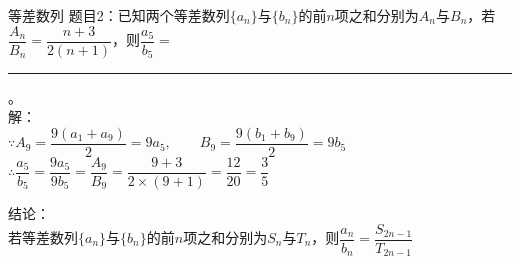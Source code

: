 \documentclass[aspectratio=169]{ctexbeamer} %
\date{\today}
\begin{document}
\begin{frame}[t]{等差数列}
题目2：已知两个等差数列$\{a_n\}$与$\{b_n\}$的前$n$项之和分别为$A_n$与$B_n$，若$\dfrac{A_n}{B_n} = \dfrac{n+3}{2(n+1)}$，则$\dfrac{a_5}{b_5} = $ \rule{5cm}{0.4pt}。\\

\vspace{0.5cm}
\pause
解：\\
$\because A_9 = \dfrac{9(a_1 + a_9)}{2} = 9a_5, \qquad B_9 = \dfrac{9(b_1 + b_9)}{2} = 9b_5$ \\
\pause
$\therefore \dfrac{a_5}{b_5} =\dfrac{9a_5}{9b_5} = \dfrac{A_9}{B_9} = \dfrac{9+3}{2 \times (9+1)} = \dfrac{12}{20} = \dfrac{3}{5}$ 

\vspace{1cm}
\pause
结论：\\
若等差数列$\{a_n\}$与$\{b_n\}$的前$n$项之和分别为$S_n$与$T_n$，则$\dfrac{a_n}{b_n} =\dfrac{S_{2n-1}}{T_{2n-1}}$
\end{frame}
\end{document}
